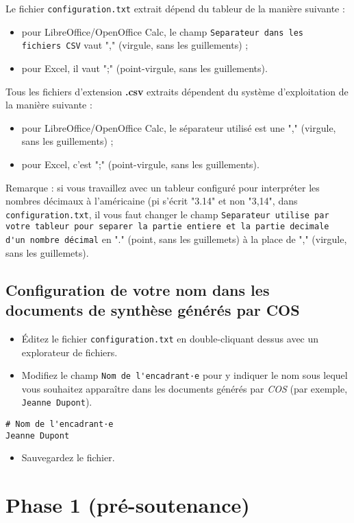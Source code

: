 \documentclass[11pt]{article}
\begin{document}
Le fichier \verb~configuration.txt~ extrait dépend du tableur de la manière
suivante :
\begin{itemize}
\item pour LibreOffice/OpenOffice Calc, le champ \verb~Separateur dans les   fichiers CSV~ vaut "," (virgule, sans les guillements) ;
\item pour Excel, il vaut ";" (point-virgule, sans les guillements).
\end{itemize}

Tous les fichiers d'extension \textbf{.csv} extraits dépendent du système d'exploitation de la
manière suivante :
\begin{itemize}
\item pour LibreOffice/OpenOffice Calc, le séparateur utilisé est une ","
(virgule, sans les guillements) ;
\item pour Excel, c'est ";" (point-virgule, sans les guillements).
\end{itemize}

Remarque : si vous travaillez avec un tableur configuré pour
interpréter les nombres décimaux à l'américaine (pi s'écrit "3.14" et
non "3,14", dans \verb~configuration.txt~, il vous faut changer le champ
\verb~Separateur utilise par votre tableur pour separer la partie entiere et la partie decimale d'un nombre décimal~ en "." (point, sans les
guillemets) à la place de "," (virgule, sans les guillemets).

\subsection{Configuration de votre nom dans les documents de synthèse générés par COS}
\label{sec-3-2}
\begin{itemize}
\item Éditez le fichier \verb~configuration.txt~ en double-cliquant dessus
avec un explorateur de fichiers.
\item Modifiez le champ \verb~Nom de l'encadrant·e~ pour y indiquer le nom sous
lequel vous souhaitez apparaître dans les documents générés par
\emph{COS} (par exemple, \verb~Jeanne Dupont~).
\end{itemize}
\begin{verbatim}
# Nom de l'encadrant·e
Jeanne Dupont
\end{verbatim}
\begin{itemize}
\item Sauvegardez le fichier.
\end{itemize}
\section{Phase 1 (pré-soutenance)}
\label{sec-4}
\end{document}
